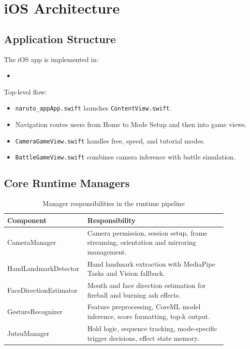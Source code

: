 \chapter{iOS Architecture}

\section{Application Structure}
The iOS app is implemented in:
\begin{itemize}[leftmargin=2em]
\item \texttt{}
\end{itemize}

Top-level flow:
\begin{itemize}[leftmargin=2em]
\item \texttt{naruto\_appApp.swift} launches \texttt{ContentView.swift}.
\item Navigation routes users from Home to Mode Setup and then into game views.
\item \texttt{CameraGameView.swift} handles free, speed, and tutorial modes.
\item \texttt{BattleGameView.swift} combines camera inference with battle simulation.
\end{itemize}

\section{Core Runtime Managers}
\begin{table}[H]
\centering
\caption{Manager responsibilities in the runtime pipeline}
\label{tab:ios_managers}
\begin{tabular}{p{0.28\linewidth}p{0.62\linewidth}}
\toprule
Component & Responsibility \\
\midrule
CameraManager & Camera permission, session setup, frame streaming, orientation and mirroring management. \\
HandLandmarkDetector & Hand landmark extraction with MediaPipe Tasks and Vision fallback. \\
FaceDirectionEstimator & Mouth and face direction estimation for fireball and burning ash effects. \\
GestureRecognizer & Feature preprocessing, CoreML model inference, score formatting, top-k output. \\
JutsuManager & Hold logic, sequence tracking, mode-specific trigger decisions, effect state memory. \\
\bottomrule
\end{tabular}
\end{table}

